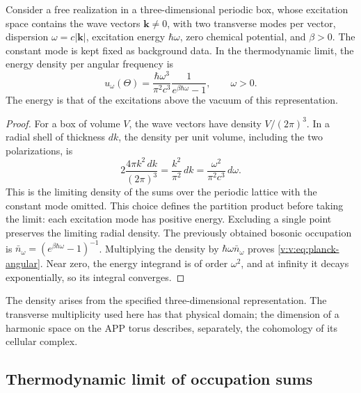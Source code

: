 \begin{proposition}
\label{v:v:prop:ley-espectral}
Consider a free realization in a three-dimensional periodic box,
whose excitation space contains the wave vectors
\(\mathbf k\ne0\), with two transverse modes per vector, dispersion
\(\omega=c|\mathbf k|\), excitation energy \(\hbar\omega\),
zero chemical potential, and \(\beta>0\). The constant mode is kept
fixed as background data. In the thermodynamic limit, the energy density
per angular frequency is
\begin{equation}
 u_\omega(\Theta)=\frac{\hbar\omega^3}{\pi^2c^3}
 \frac{1}{e^{\beta\hbar\omega}-1},\qquad \omega>0.
 \label{v:v:eq:planck-angular}
\end{equation}
The energy is that of the excitations above the vacuum of this
representation.
\end{proposition}

\begin{proof}
For a box of volume \(V\), the wave vectors have density
\(V/(2\pi)^3\). In a radial shell of thickness \(dk\), the density
per unit volume, including the two polarizations, is
\[
 2\frac{4\pi k^2\,dk}{(2\pi)^3}=\frac{k^2}{\pi^2}\,dk
 =\frac{\omega^2}{\pi^2c^3}\,d\omega.
\]
This is the limiting density of the sums over the periodic lattice
with the constant mode omitted. This choice defines the partition product
before taking the limit: each excitation mode has positive energy.
Excluding a single point preserves the limiting radial density.
The previously obtained bosonic occupation is
\(\bar n_\omega=(e^{\beta\hbar\omega}-1)^{-1}\).
Multiplying the density by \(\hbar\omega\bar n_\omega\) proves
\eqref{v:v:eq:planck-angular}. Near zero, the energy integrand is
of order \(\omega^2\), and at infinity it decays exponentially, so
its integral converges.
\end{proof}

The density arises from the specified three-dimensional representation.
The transverse multiplicity used here has that physical domain;
the dimension of a harmonic space on the APP torus describes,
separately, the cohomology of its cellular complex.


\subsection{Thermodynamic limit of occupation sums}
\label{v:v:subsec:limite-termodinamico}

